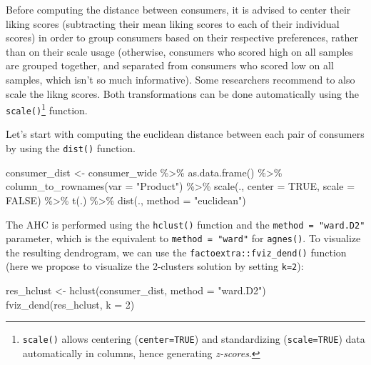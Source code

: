 \documentclass[
]{krantz}
\makeatletter
\newenvironment{Shaded}{\begin{snugshade}}{\end{snugshade}}
\newcommand{\AttributeTok}[1]{\textcolor[rgb]{0.61,0.61,0.61}{#1}}
\newcommand{\ConstantTok}[1]{\textcolor[rgb]{0,0,0}{#1}}
\newcommand{\DecValTok}[1]{\textcolor[rgb]{0.06,0.06,0.06}{#1}}
\newcommand{\FunctionTok}[1]{\textcolor[rgb]{0,0,0}{#1}}
\newcommand{\NormalTok}[1]{#1}
\newcommand{\OtherTok}[1]{\textcolor[rgb]{0.37,0.37,0.37}{#1}}
\newcommand{\SpecialCharTok}[1]{\textcolor[rgb]{0,0,0}{#1}}
\newcommand{\StringTok}[1]{\textcolor[rgb]{0.5,0.5,0.5}{#1}}
\renewenvironment{quote}{\begin{VF}}{\end{VF}}
\newenvironment{kframe}{%
\medskip{}
\setlength{\fboxsep}{.8em}
 \def\at@end@of@kframe{}%
 \ifinner\ifhmode%
  \def\at@end@of@kframe{\end{minipage}}%
  \begin{minipage}{\columnwidth}%
 \fi\fi%
 \def\FrameCommand##1{\hskip\@totalleftmargin \hskip-\fboxsep
 \colorbox{shadecolor}{##1}\hskip-\fboxsep
     \hskip-\linewidth \hskip-\@totalleftmargin \hskip\columnwidth}%
 \MakeFramed {\advance\hsize-\width
   \@totalleftmargin\z@ \linewidth\hsize
   \@setminipage}}%
 {\par\unskip\endMakeFramed%
 \at@end@of@kframe}
\renewenvironment{Shaded}{\begin{kframe}}{\end{kframe}}
\makeatother
\begin{document}
\begin{quote}
Before computing the distance between consumers, it is advised to center their liking scores (subtracting their mean liking scores to each of their individual scores) in order to group consumers based on their respective preferences, rather than on their scale usage (otherwise, consumers who scored high on all samples are grouped together, and separated from consumers who scored low on all samples, which isn't so much informative). Some researchers recommend to also scale the likng scores. Both transformations can be done automatically using the \texttt{scale()}\footnote{\texttt{scale()} allows centering (\texttt{center=TRUE}) and standardizing (\texttt{scale=TRUE}) data automatically in columns, hence generating \emph{z-scores}.} function.
\end{quote}

Let's start with computing the euclidean distance between each pair of consumers by using the \texttt{dist()} function.

\begin{Shaded}
\begin{Highlighting}[]
\NormalTok{consumer\_dist }\OtherTok{\textless{}{-}}\NormalTok{ consumer\_wide }\SpecialCharTok{\%\textgreater{}\%}
  \FunctionTok{as.data.frame}\NormalTok{() }\SpecialCharTok{\%\textgreater{}\%}
  \FunctionTok{column\_to\_rownames}\NormalTok{(}\AttributeTok{var =} \StringTok{"Product"}\NormalTok{) }\SpecialCharTok{\%\textgreater{}\%}
  \FunctionTok{scale}\NormalTok{(., }\AttributeTok{center =} \ConstantTok{TRUE}\NormalTok{, }\AttributeTok{scale =} \ConstantTok{FALSE}\NormalTok{) }\SpecialCharTok{\%\textgreater{}\%}
  \FunctionTok{t}\NormalTok{(.) }\SpecialCharTok{\%\textgreater{}\%}
  \FunctionTok{dist}\NormalTok{(., }\AttributeTok{method =} \StringTok{"euclidean"}\NormalTok{)}
\end{Highlighting}
\end{Shaded}

The AHC is performed using the \texttt{hclust()} function and the \texttt{method\ =\ "ward.D2"} parameter, which is the equivalent to \texttt{method\ =\ "ward"} for \texttt{agnes()}. To visualize the resulting dendrogram, we can use the \texttt{factoextra::fviz\_dend()} function (here we propose to visualize the 2-clusters solution by setting \texttt{k=2}):

\begin{Shaded}
\begin{Highlighting}[]
\NormalTok{res\_hclust }\OtherTok{\textless{}{-}} \FunctionTok{hclust}\NormalTok{(consumer\_dist, }\AttributeTok{method =} \StringTok{"ward.D2"}\NormalTok{)}
\FunctionTok{fviz\_dend}\NormalTok{(res\_hclust, }\AttributeTok{k =} \DecValTok{2}\NormalTok{)}
\end{Highlighting}
\end{Shaded}
\end{document}
